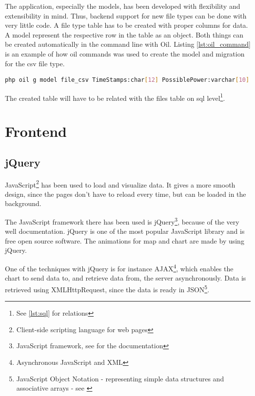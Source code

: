 The application, especially the models, has been developed with flexibility and extensibility in mind. Thus, backend support for new file types can be done with very little code. A file type table has to be created with proper columns for data. A \textsf{model} represent the respective row in the table as an object. Both things can be created automatically in the command line with Oil. Listing \ref{lst:oil_command} is an example of how oil commands was used to create the model and migration for the csv file type.
\begin{lstlisting}[language=sh,caption={Oil command for creating model and migration},label={lst:oil_command}]
php oil g model file_csv TimeStamps:char[12] PossiblePower:varchar[10] WindSpeed:varchar[10] RegimePossible:varchar[10] OutputPower:varchar[10] RegimeOutput:varchar[10] TimeStampsR:char[19] file_id:bigint
\end{lstlisting}

The created table will have to be related with the \textsf{files} table on sql level\footnote{See \ref{lst:sql} for relations}.

\section{Frontend}
\subsection{jQuery}
JavaScript\footnote{Client-side scripting language for web pages} has been used to load and visualize data. It gives a more smooth design, since the pages don't have to reload every time, but can be loaded in the background.

The JavaScript framework there has been used is jQuery\footnote{JavaScript framework, see \cite{jquery} for the documentation}, because of the very well documentation. jQuery is one of the most popular JavaScript library and is free open source software. The animations for map and chart are made by using jQuery.
 
One of the techniques with jQuery is for instance AJAX\footnote{Asynchronous JavaScript and XML}, which enables the chart to send data to, and retrieve data from, the server asynchronously. Data is retrieved using XMLHttpRequest, since the data is ready in JSON\footnote{JavaScript Object Notation - representing simple data structures and associative arrays - see \cite{json}}.

